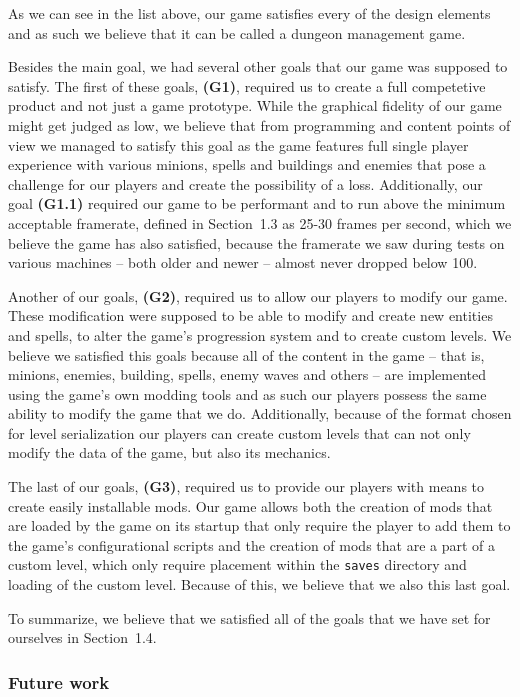 As we can see in the list above, our game satisfies every of the design elements and as such we believe that it can be called a dungeon
management game.

Besides the main goal, we had several other goals that our game was supposed to satisfy. The first of these goals, \textbf{(G1)}, required
us to create a full competetive product and not just a game prototype. While the graphical fidelity of our game might get judged as low,
we believe that from programming and content points of view we managed to satisfy this goal as the game features full single player
experience with various minions, spells and buildings and enemies that pose a challenge for our players and create the possibility of a
loss. Additionally, our goal \textbf{(G1.1)} required our game to be performant and to run above the minimum acceptable framerate,
defined in Section~1.3 as 25-30 frames per second, which we believe the game has also satisfied, because the framerate we saw during
tests on various machines -- both older and newer -- almost never dropped below 100.

Another of our goals, \textbf{(G2)}, required us to allow our players to modify our game. These modification were supposed to be able
to modify and create new entities and spells, to alter the game's progression system and to create custom levels.
We believe we satisfied this goals because all of the content in the game -- that is, minions, enemies, building, spells, enemy waves and
others -- are implemented using the game's own modding tools and as such our players possess the same ability to modify the game that
we do. Additionally, because of the format chosen for level serialization our players can create custom levels that can not only
modify the data of the game, but also its mechanics.

The last of our goals, \textbf{(G3)}, required us to provide our players with means to create easily installable mods. Our game allows
both the creation of mods that are loaded by the game on its startup that only require the player to add them to the game's
configurational scripts and the creation of mods that are a part of a custom level, which only require placement within the
\texttt{saves} directory and loading of the custom level. Because of this, we believe that we also this last goal.

To summarize, we believe that we satisfied all of the goals that we have set for ourselves in Section~1.4.

\subsubsection{Future work}

